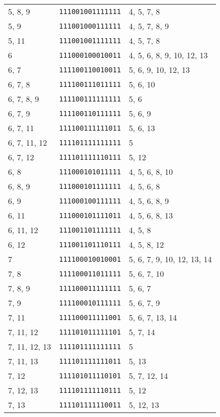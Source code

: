 \documentclass[a4paper,12pt]{article}
\begin{document}
\begin{longtable}{l|l|l}
        5, 8, 9&\texttt{111001001111111}&4, 5, 7, 8\\
        5, 9&\texttt{111001000111111}&4, 5, 7, 8, 9\\
        5, 11&\texttt{111001001111111}&4, 5, 7, 8\\
        6&\texttt{111000100010011}&4, 5, 6, 8, 9, 10, 12, 13\\
        6, 7&\texttt{111100110010011}&5, 6, 9, 10, 12, 13\\
        6, 7, 8&\texttt{111100111011111}&5, 6, 10\\
        6, 7, 8, 9&\texttt{111100111111111}&5, 6\\
        6, 7, 9&\texttt{111100110111111}&5, 6, 9\\
        6, 7, 11&\texttt{111100111111011}&5, 6, 13\\
        6, 7, 11, 12&\texttt{111101111111111}&5\\
        6, 7, 12&\texttt{111101111110111}&5, 12\\
        6, 8&\texttt{111000101011111}&4, 5, 6, 8, 10\\
        6, 8, 9&\texttt{111000101111111}&4, 5, 6, 8\\
        6, 9&\texttt{111000100111111}&4, 5, 6, 8, 9\\
        6, 11&\texttt{111000101111011}&4, 5, 6, 8, 13\\
        6, 11, 12&\texttt{111001101111111}&4, 5, 8\\
        6, 12&\texttt{111001101110111}&4, 5, 8, 12\\
        7&\texttt{111100010010001}&5, 6, 7, 9, 10, 12, 13, 14\\
        7, 8&\texttt{111100011011111}&5, 6, 7, 10\\
        7, 8, 9&\texttt{111100011111111}&5, 6, 7\\
        7, 9&\texttt{111100010111111}&5, 6, 7, 9\\
        7, 11&\texttt{111100011111001}&5, 6, 7, 13, 14\\
        7, 11, 12&\texttt{111101011111101}&5, 7, 14\\
        7, 11, 12, 13&\texttt{111101111111111}&5\\
        7, 11, 13&\texttt{111101111111011}&5, 13\\
        7, 12&\texttt{111101011110101}&5, 7, 12, 14\\
        7, 12, 13&\texttt{111101111110111}&5, 12\\
        7, 13&\texttt{111101111110011}&5, 12, 13\\

\end{longtable}
\end{document}

